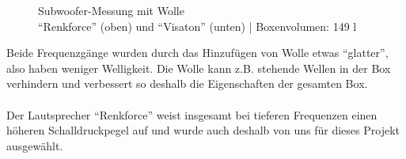 \begin{figure} [H]
	\centering
	\quad
	\caption{Subwoofer-Messung mit Wolle\\ \enquote{Renkforce} (oben) und \enquote{Visaton} (unten) | Boxenvolumen: 149 l}
	\label{fig:4.2.3.3}
\end{figure}
Beide Frequenzgänge wurden durch das Hinzufügen von Wolle etwas \enquote{glatter}, also haben weniger Welligkeit.
Die Wolle kann z.B. stehende Wellen in der Box verhindern und verbessert so deshalb die Eigenschaften der gesamten Box.\\ \\	%
Der Lautsprecher \enquote{Renkforce} weist insgesamt bei tieferen Frequenzen einen höheren Schalldruckpegel auf und wurde auch deshalb von uns für dieses Projekt ausgewählt.


